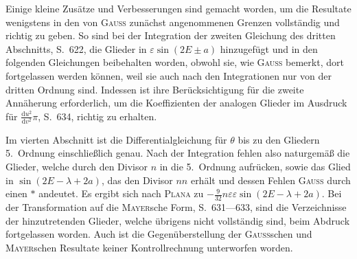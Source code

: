 \par\noindent\hspace*{\parindent}Einige kleine Zusätze und Verbesserungen sind gemacht worden, um die Resultate wenigstens in den
von \textsc{Gauss} zunächst angenommenen Grenzen vollständig und richtig zu geben. So sind bei der Integration
der zweiten Gleichung des dritten Abschnitts, S.~622, die Glieder in \(\varepsilon\sin(2E\pm a)\) hinzugefügt und in
den folgenden Gleichungen beibehalten worden, obwohl sie, wie \textsc{Gauss} bemerkt, dort fortgelassen werden
können, weil sie auch nach den Integrationen nur von der dritten Ordnung sind. Indessen ist ihre Berücksichtigung
für die zweite Annäherung erforderlich, um die Koeffizienten der analogen Glieder im Ausdruck
für \(\frac{\mathrm du^2}{\mathrm dv^2}\pi\), S.~634, richtig zu erhalten.

\par\noindent\hspace*{\parindent}Im vierten Abschnitt ist die Differentialgleichung für \(\theta\) bis zu den Gliedern 5.~Ordnung einschließlich
genau. Nach der Integration fehlen also naturgemäß die Glieder, welche durch den Divisor \(n\) in die
5.~Ordnung aufrücken, sowie das Glied in \(\sin(2E-\lambda+2a)\), das den Divisor \(nn\) erhält und dessen
Fehlen \textsc{Gauss} durch einen \(*\) andeutet. Es ergibt sich nach \textsc{Plana} zu \(-\frac{9}{32}n\varepsilon\varepsilon\sin(2E-\lambda+2a)\).
Bei der Transformation auf die \textsc{Mayer}sche Form, S.~631---633, sind die Verzeichnisse der hinzutretenden Glieder,
welche übrigens nicht vollständig sind, beim Abdruck fortgelassen worden. Auch ist die Gegenüberstellung
der \textsc{Gauss}schen und \textsc{Mayer}schen Resultate keiner Kontrollrechnung unterworfen worden.


